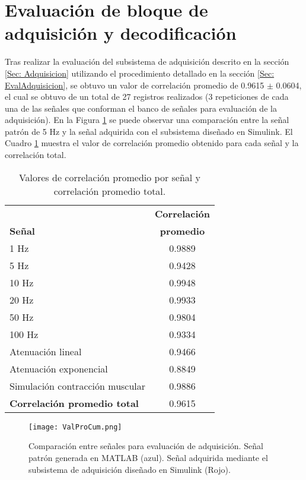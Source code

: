 
\section{Evaluación de bloque de adquisición y decodificación}
Tras realizar la evaluación del subsistema de adquisición descrito en la sección \ref{Sec: Adquisicion} utilizando el procedimiento detallado en la sección \ref{Sec: EvalAdquisicion}, se obtuvo un valor de correlación promedio de 0.9615 $\pm$ 0.0604, el cual se obtuvo de un total de 27 registros realizados (3 repeticiones de cada una de las señales que conforman el banco de señales para evaluación de la adquisición). En la Figura \ref{Figura: ValProCum} se puede observar una comparación entre la señal patrón de 5 Hz y la señal adquirida con el subsistema diseñado en Simulink\textregistered. El Cuadro \ref{Cuadro:ValoresCorre} muestra el valor de correlación promedio obtenido para cada señal y la correlación total.

\begin{table}[htbp]
	\centering
	\begin{tabular}{|l|c|}
	\hline
	\textbf{} & \textbf{Correlación}\\ 
	\textbf{Señal} & \textbf{promedio}\\ \hline	\hline
	1 Hz & 0.9889\\ \hline
	5 Hz & 0.9428\\ \hline
	10 Hz & 0.9948\\ \hline
	20 Hz & 0.9933\\ \hline
	50 Hz & 0.9804\\ \hline
	100 Hz & 0.9334\\ \hline
	Atenuación lineal & 0.9466\\ \hline
	Atenuación exponencial & 0.8849\\ \hline
	Simulación contracción muscular & 0.9886\\ \hline
	\textbf{Correlación promedio total} & 0.9615\\ \hline
	\end{tabular}
	\caption{Valores de correlación promedio por señal y correlación promedio total.}
	\label{Cuadro:ValoresCorre}
\end{table}

\begin{figure}[htbp]
	\centering
	\texttt{[image: ValProCum.png]}
	\caption[Comparación entre señales para evaluación de adquisición.]{Comparación entre señales para evaluación de adquisición. Señal patrón generada en MATLAB\textregistered \; (azul). Señal adquirida mediante el subsistema de adquisición diseñado en Simulink\textregistered \; (Rojo).}
	\label{Figura: ValProCum}
\end{figure}


